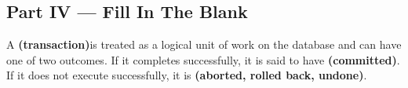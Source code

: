\documentclass[12pt, addpoints]{exam}
\begin{document}
\begin{questions}
\section*{Part IV — Fill In The Blank}

\begin{minipage}{\linewidth}
\question[4]
A \fillin[][8em] \ifprintanswers\textbf{(transaction)}\fi is treated as a logical unit of work on the database and can have one of two outcomes. 
If it completes successfully, it is said to have \fillin[][8em] \ifprintanswers\textbf{(committed)}\fi. 
If it does not execute successfully, it is \fillin[][8em] \ifprintanswers\textbf{(aborted, rolled back, undone)}\fi.
\end{minipage}\vspace{1em}
\end{questions}
\end{document}
